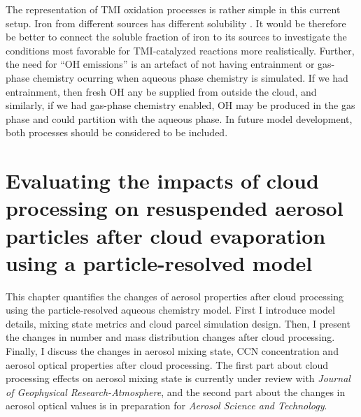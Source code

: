 \documentclass[edeposit,fullpage]{uiucthesis2009}
\begin{document}
The representation of TMI oxidation processes is rather simple in this
current setup. Iron from different sources has different solubility
\citep{desboeufs2005dissolution}. It would be therefore be better to
connect the soluble fraction of iron to its sources to investigate the
conditions most favorable for TMI-catalyzed reactions more
realistically. Further, the need for ``OH emissions'' is an artefact
of not having entrainment or gas-phase chemistry ocurring when aqueous
phase chemistry is simulated. If we had entrainment, then fresh OH any
be supplied from outside the cloud, and similarly, if we had gas-phase
chemistry enabled, OH may be produced in the gas phase and could
partition with the aqueous phase. In future model development, both
processes should be considered to be included.

\chapter{Evaluating the impacts of cloud processing on resuspended aerosol particles after cloud evaporation using a particle-resolved model}

This chapter quantifies the changes of aerosol properties after cloud
processing using the particle-resolved aqueous chemistry model. First
I introduce model details, mixing state metrics and cloud parcel
simulation design. Then, I present the changes in number and mass
distribution changes after cloud processing. Finally, I discuss the
changes in aerosol mixing state, CCN concentration and aerosol optical
properties after cloud processing. The first part about cloud
processing effects on aerosol mixing state is currently under review
with \textit{Journal of Geophysical Research-Atmosphere}, and the
second part about the changes in aerosol optical values is in
preparation for \textit{Aerosol Science and Technology}.
  
\label{chap3}
\end{document}
